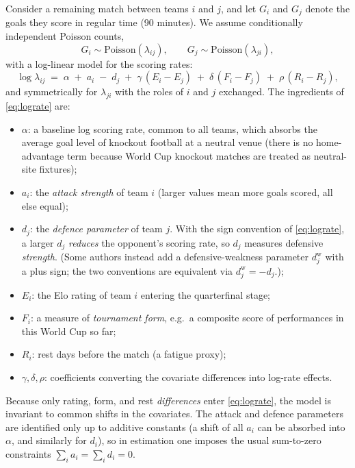 \documentclass[11pt]{article}
\begin{document}
Consider a remaining match between teams $i$ and $j$, and let $G_i$ and $G_j$
denote the goals they score in regular time (90 minutes). We assume
conditionally independent Poisson counts,
\begin{equation}
G_i \sim \mathrm{Poisson}(\lambda_{ij}),
\qquad
G_j \sim \mathrm{Poisson}(\lambda_{ji}),
\label{eq:poisson}
\end{equation}
with a log-linear model for the scoring rates:
\begin{equation}
\log \lambda_{ij}
\;=\;
\alpha \;+\; a_i \;-\; d_j
\;+\; \gamma \,(E_i - E_j)
\;+\; \delta \,(F_i - F_j)
\;+\; \rho \,(R_i - R_j),
\label{eq:lograte}
\end{equation}
and symmetrically for $\lambda_{ji}$ with the roles of $i$ and $j$ exchanged.
The ingredients of \eqref{eq:lograte} are:
\begin{itemize}
  \item $\alpha$: a baseline log scoring rate, common to all teams, which
        absorbs the average goal level of knockout football at a neutral
        venue (there is no home-advantage term because World Cup knockout
        matches are treated as neutral-site fixtures);
  \item $a_i$: the \emph{attack strength} of team $i$ (larger values mean
        more goals scored, all else equal);
  \item $d_j$: the \emph{defence parameter} of team $j$. With the sign
        convention of \eqref{eq:lograte}, a larger $d_j$ \emph{reduces} the
        opponent's scoring rate, so $d_j$ measures defensive
        \emph{strength}. (Some authors instead add a defensive-weakness
        parameter $d_j^{\mathrm{w}}$ with a plus sign; the two conventions
        are equivalent via $d_j^{\mathrm{w}} = -d_j$.);
  \item $E_i$: the Elo rating of team $i$ entering the quarterfinal stage;
  \item $F_i$: a measure of \emph{tournament form}, e.g.\ a composite score
        of performances in this World Cup so far;
  \item $R_i$: rest days before the match (a fatigue proxy);
  \item $\gamma, \delta, \rho$: coefficients converting the covariate
        differences into log-rate effects.
\end{itemize}

Because only rating, form, and rest \emph{differences} enter
\eqref{eq:lograte}, the model is invariant to common shifts in the covariates.
The attack and defence parameters are identified only up to additive
constants (a shift of all $a_i$ can be absorbed into $\alpha$, and similarly
for $d_i$), so in estimation one imposes the usual sum-to-zero constraints
$\sum_i a_i = \sum_i d_i = 0$.
\end{document}
